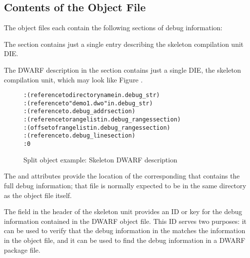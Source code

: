 \clearpage
\subsection{Contents of the Object File}
The object files each contain the following sections of debug
information:
\begin{alltt}
  \dotdebugabbrev
  \dotdebuginfo
  \dotdebugranges
  \dotdebugline
  \dotdebugstr
  \dotdebugaddr
  \dotdebugnames
  \dotdebugaranges
\end{alltt}

The \dotdebugabbrev{} section contains just a single entry describing
the skeleton compilation unit DIE.

The DWARF description in the \dotdebuginfo{} section 
contains just a single DIE, the skeleton compilation unit, 
which may look like 
Figure .

\begin{figure}[ht]
\begin{dwflisting}
\begin{alltt}

    \DWTAGskeletonunit
        \DWATcompdir: (reference to directory name in .debug_str)
        \DWATdwoname: (reference to "demo1.dwo" in .debug_str)
        \DWATaddrbase: (reference to .debug_addr section)
        \DWATrangesbase: (reference to range list in .debug_ranges section)
        \DWATranges: (offset of range list in .debug_ranges section)
        \DWATstmtlist: (reference to .debug_line section)
        \DWATlowpc: 0
      
\end{alltt}
\end{dwflisting}
\caption{Split object example: Skeleton DWARF description}
\label{fig:splitdwafexampleskeletondwarfdescription}
\end{figure}

The \DWATcompdir{} and \DWATdwoname{} attributes provide the
location of the corresponding \splitDWARFobjectfile{} that
contains the full debug information; that file is normally
expected to be in the same directory as the object file itself.

The \HFNdwoid{} field in the header of the skeleton unit provides 
an ID or key for the debug information contained in the 
DWARF object file. This ID serves
two purposes: it can be used to verify that the debug information
in the \splitDWARFobjectfile{} matches the information in the object
file, and it can be used to find the debug information in a DWARF
package file.


